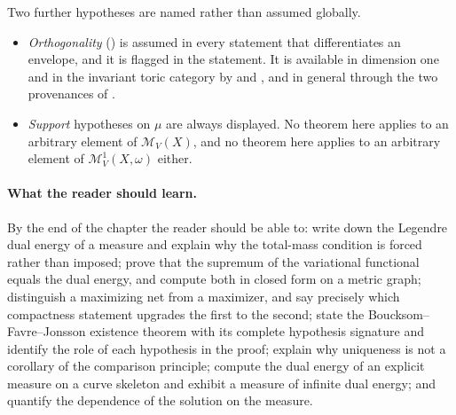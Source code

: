 Two further hypotheses are named rather than assumed globally.

\begin{itemize}
\item \emph{Orthogonality} () is assumed in
every statement that differentiates an envelope, and it is flagged in the
statement.  It is available in dimension one and in the invariant toric
category by  and
, and in general through the two
provenances of .
\item \emph{Support} hypotheses on \(\mu\) are always displayed.  No theorem
here applies to an arbitrary element of \(\mathcal M_V(X)\), and no theorem
here applies to an arbitrary element of \(\mathcal M^1_V(X,\omega)\) either.
\end{itemize}

\paragraph{What the reader should learn.}
By the end of the chapter the reader should be able to: write down the
Legendre dual energy of a measure and explain why the total-mass condition
is forced rather than imposed; prove that the supremum of the variational
functional equals the dual energy, and compute both in closed form on a
metric graph; distinguish a maximizing net from a maximizer, and say
precisely which compactness statement upgrades the first to the second;
state the Boucksom--Favre--Jonsson existence theorem with its complete
hypothesis signature and identify the role of each hypothesis in the proof;
explain why uniqueness is not a corollary of the comparison principle;
compute the dual energy of an explicit measure on a curve skeleton and
exhibit a measure of infinite dual energy; and quantify the dependence of
the solution on the measure.

